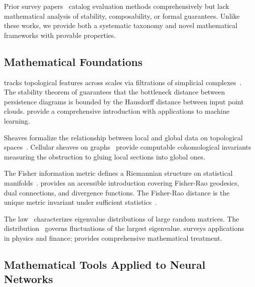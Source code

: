 Prior survey papers~\citep{chang2024survey, guo2023evaluating} catalog evaluation methods comprehensively but lack mathematical analysis of stability, composability, or formal guarantees.
Unlike these works, we provide both a systematic taxonomy and novel mathematical frameworks with provable properties.

\subsection{Mathematical Foundations}

\PH tracks topological features across scales via filtrations of simplicial complexes~\citep{edelsbrunner2008persistent, carlsson2009topology}.
The stability theorem of \citet{cohen2007stability} guarantees that the bottleneck distance between persistence diagrams is bounded by the Hausdorff distance between input point clouds.
\citet{chazal2021introduction} provide a comprehensive introduction with applications to machine learning.

Sheaves formalize the relationship between local and global data on topological spaces~\citep{bredon1997sheaf}.
Cellular sheaves on graphs~\citep{curry2014sheaves, hansen2017sheaf} provide computable cohomological invariants measuring the obstruction to gluing local sections into global ones.

The Fisher information metric defines a Riemannian structure on statistical manifolds~\citep{amari2016information, amari1998natural}.
\citet{nielsen2020elementary} provides an accessible introduction covering Fisher-Rao geodesics, dual connections, and divergence functions.
The Fisher-Rao distance is the unique metric invariant under sufficient statistics~\citep{cencov1982statistical}.

The \marchpast law~\citep{marchenkopastur1967} characterizes eigenvalue distributions of large random matrices.
The \tw distribution~\citep{tracy1996orthogonal} governs fluctuations of the largest eigenvalue.
\citet{bouchaud2009random} surveys applications in physics and finance; \citet{mehta2004random} provides comprehensive mathematical treatment.

\subsection{Mathematical Tools Applied to Neural Networks}


